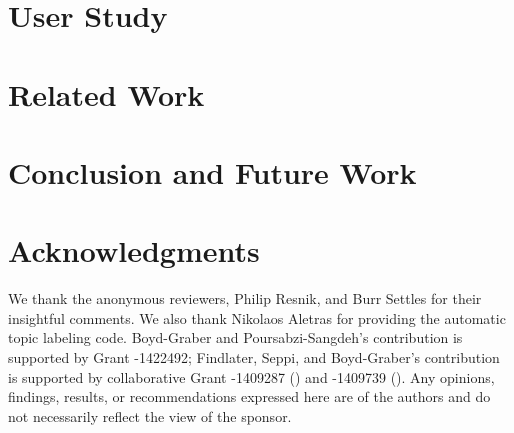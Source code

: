 \documentclass[11pt]{article}
\begin{document}
\section{User Study}
\label{sec:user_exp_results}

\section{Related Work}
\label{sec:related_work}

\section{Conclusion and Future Work}
\label{sec:conclusion}


\section*{Acknowledgments}
We thank the anonymous reviewers, Philip Resnik, and Burr Settles for
their insightful comments. We also thank Nikolaos Aletras for
providing the automatic topic labeling code.  Boyd-Graber and
Poursabzi-Sangdeh's contribution is supported by  Grant
-1422492; Findlater, Seppi, and Boyd-Graber's contribution
is supported by collaborative  Grant -1409287
() and -1409739 ().  Any opinions,
findings, results, or recommendations expressed here are of the
authors and do not necessarily reflect the view of the sponsor.



\end{document}
